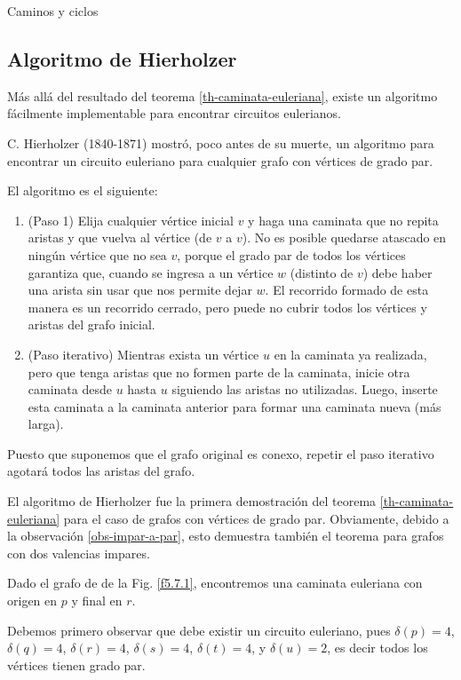 \begin{section}{Caminos y ciclos}
\subsection*{Algoritmo de Hierholzer}

Más allá del resultado del teorema \ref{th-caminata-euleriana}, existe un algoritmo fácilmente implementable para encontrar circuitos eulerianos.

C. Hierholzer (1840-1871) mostró, poco antes de su muerte, un algoritmo para encontrar un circuito euleriano  para cualquier grafo  con vértices de grado  par.

El  algoritmo es el siguiente: 
\begin{enumerate}
    \item (Paso 1) Elija cualquier vértice  inicial $v$ y haga una caminata  que no repita aristas y  que vuelva al vértice (de $v$ a $v$). No es posible quedarse atascado en ningún vértice que no sea $v$, porque el grado par de todos los vértices garantiza que, cuando se ingresa a un vértice $w$ (distinto de $v$) debe haber una  arista sin usar que nos permite dejar $w$. El recorrido formado de esta manera es un recorrido cerrado, pero puede no cubrir todos los vértices y aristas del grafo inicial.
    \item (Paso iterativo) Mientras exista un vértice $u$ en la caminata ya realizada, pero que tenga aristas que no formen parte de la caminata, inicie otra caminata desde $u$ hasta $u$ siguiendo las aristas no utilizadas. Luego,  inserte esta  caminata a la caminata  anterior para formar una caminata nueva (más larga).
\end{enumerate}

Puesto que suponemos que el grafo original es conexo, repetir el paso iterativo agotará todos las aristas del grafo.

El algoritmo de Hierholzer fue la primera demostración del teorema \ref{th-caminata-euleriana} para el caso  de grafos con vértices de grado par. Obviamente,  debido a la observación  \ref{obs-impar-a-par}, esto demuestra también el teorema para grafos con dos valencias impares.
  
\begin{ejemplo*} Dado  el  grafo de de la  Fig. \ref{f5.7.1}, encontremos una caminata euleriana con origen en $p$ y final en $r$. 

Debemos primero observar que  debe existir un circuito euleriano, pues $\delta(p)=4$, $\delta(q)=4$, $\delta(r)=4$, $\delta(s)=4$,
$\delta(t)=4$, y $\delta(u)=2$,  es decir todos los vértices tienen grado par. 



\end{ejemplo*}
\end{section}
